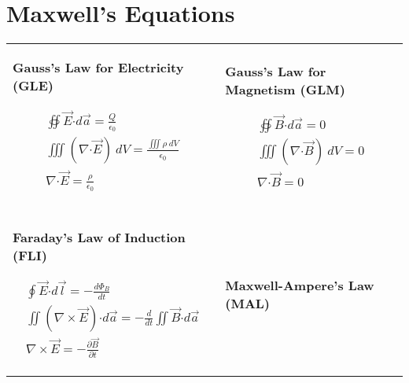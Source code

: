 \documentclass[12pt]{article}
\newcommand*{\dotP}{\boldsymbol \cdot}		%
\begin{document}
\setlength{\parindent}{0pt}

\section{Maxwell's Equations}

\vspace{15pt}
{
\tabcolsep=0pt
\renewcommand{\arraystretch}{0}
\begin{tabular}{p{.49\linewidth} p{.49\linewidth}}
	{
		\textbf{Gauss's Law for Electricity (GLE)}
		
		\begin{gather*}
			\boxed{ \oiint \vec{E} \dotP d\vec{a} = \frac{Q}{\epsilon_0} }\\
			\iiint (\nabla \dotP \vec{E})\ dV = \frac{\iiint \rho\ dV}{\epsilon_0} \\
			\boxed{ \nabla \dotP \vec{E} = \frac{\rho}{\epsilon_0} }
		\end{gather*} 
	} &
	{
		\textbf{Gauss's Law for Magnetism (GLM)}

		\begin{gather*}
			\boxed{ \oiint \vec{B} \dotP d\vec{a} = 0 }\\
			\iiint (\nabla \dotP \vec{B} )\ dV = 0 \\
			\boxed{ \nabla \dotP \vec{B} = 0 }
		\end{gather*}
	} \\ \\[10pt]
	{
		\textbf{Faraday's Law of Induction (FLI)}

		\begin{gather*}
			\boxed{ \oint \vec{E} \dotP d\vec{l} = -\frac{d\Phi_B}{dt} }\\
			\iint (\nabla \times \vec{E}) \dotP d\vec{a} = -\frac{d}{dt} \iint \vec{B} \dotP d\vec{a} \\
			\boxed{ \nabla \times \vec{E} = -\frac{\partial \vec{B}}{\partial t} }
		\end{gather*}
	} &
	{
		\textbf{Maxwell-Ampere's Law (MAL)}

}
\end{tabular}}
\end{document}
